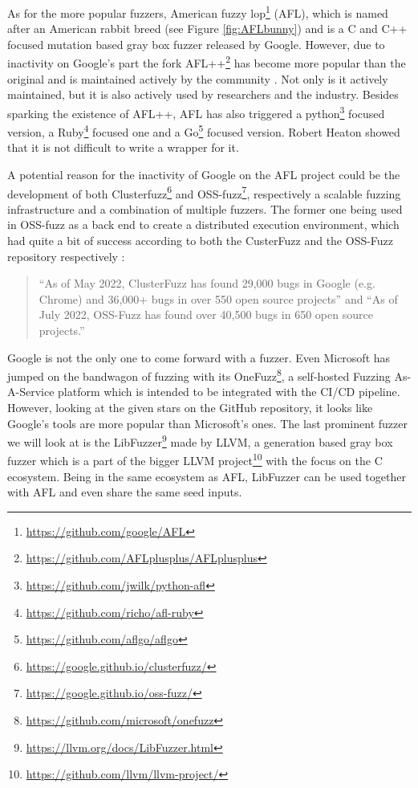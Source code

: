 As for the more popular fuzzers, American fuzzy lop\footnote{\url{https://github.com/google/AFL}} (AFL), which is named after an American rabbit breed (see Figure \ref{fig:AFLbunny}) and is a C and C++ focused mutation based gray box fuzzer released by Google. However, due to inactivity on Google’s part the fork AFL++\footnote{\url{https://github.com/AFLplusplus/AFLplusplus}} has become more popular than the original and is maintained actively by the community \cite{27AFL++}. Not only is it actively maintained, but it is also actively used by researchers and the industry. Besides sparking the existence of AFL++, AFL has also triggered a python\footnote{\url{https://github.com/jwilk/python-afl}} focused version, a Ruby\footnote{\url{https://github.com/richo/afl-ruby}} focused one and a Go\footnote{\url{https://github.com/aflgo/aflgo}} focused version. Robert Heaton \cite{AFLWrapper} showed that it is not difficult to write a wrapper for it.

A potential reason for the inactivity of Google on the AFL project could be the development of both Clusterfuzz\footnote{\url{https://google.github.io/clusterfuzz/}} and OSS-fuzz\footnote{\url{https://google.github.io/oss-fuzz/}}, respectively a scalable fuzzing infrastructure and a combination of multiple fuzzers. The former one being used in OSS-fuzz as a back end to create a distributed execution environment, which had quite a bit of success according to both the CusterFuzz and the OSS-Fuzz repository respectively \cite{31OSS-FuzzBugs}:
\begin{quote} %
	“As of May 2022, ClusterFuzz has found 29,000 bugs in Google (e.g. Chrome) and 36,000+ bugs in over 550 open source projects” and \newline
	“As of July 2022, OSS-Fuzz has found over 40,500 bugs in 650 open source projects.”	
\end{quote}  

Google is not the only one to come forward with a fuzzer. Even Microsoft has jumped on the bandwagon of fuzzing with its OneFuzz\footnote{\url{https://github.com/microsoft/onefuzz}}, a self-hosted Fuzzing As-A-Service platform which is intended to be integrated with the CI/CD pipeline. However, looking at the given stars on the GitHub repository, it looks like Google’s tools are more popular than Microsoft’s ones. The last prominent fuzzer we will look at is the LibFuzzer\footnote{\url{https://llvm.org/docs/LibFuzzer.html}} made by LLVM, a generation based gray box fuzzer which is a part of the bigger LLVM project\footnote{\url{https://github.com/llvm/llvm-project/}} with the focus on the C ecosystem. Being in the same ecosystem as AFL, LibFuzzer can be used together with AFL and even share the same seed inputs.

